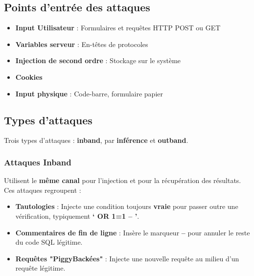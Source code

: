\documentclass{report}
\begin{document}
		\subsection{Points d'entrée des attaques}

			\begin{itemize}
			 	\item \textbf{Input Utilisateur} : Formulaires et requêtes HTTP POST ou GET
			 	\item \textbf{Variables serveur} : En-têtes de protocoles
			 	\item \textbf{Injection de second ordre} : Stockage sur le système
			 	\item \textbf{Cookies}
			 	\item \textbf{Input physique} : Code-barre, formulaire papier\\
			\end{itemize} 

		\subsection{Types d'attaques}

			Trois types d'attaques : \textbf{inband}, par \textbf{inférence} et \textbf{outband}.\\

			\subsubsection{Attaques Inband}

				Utilisent le \textbf{même canal} pour l'injection et pour la récupération des résultats.\\
				Ces attaques regroupent : \\

				\begin{itemize}
					\item \textbf{Tautologies} : Injecte une condition toujours \textbf{vraie} pour passer outre une vérification, typiquement \textbf{‘ OR 1=1 – ’}.\\
					\item \textbf{Commentaires de fin de ligne} : Insère le marqueur \textbf{--} pour annuler le reste du code SQL légitime.\\
					\item \textbf{Requêtes "PiggyBackées"} : Injecte une nouvelle requête au milieu d'un requête légitime.\\
				\end{itemize}
\end{document}
